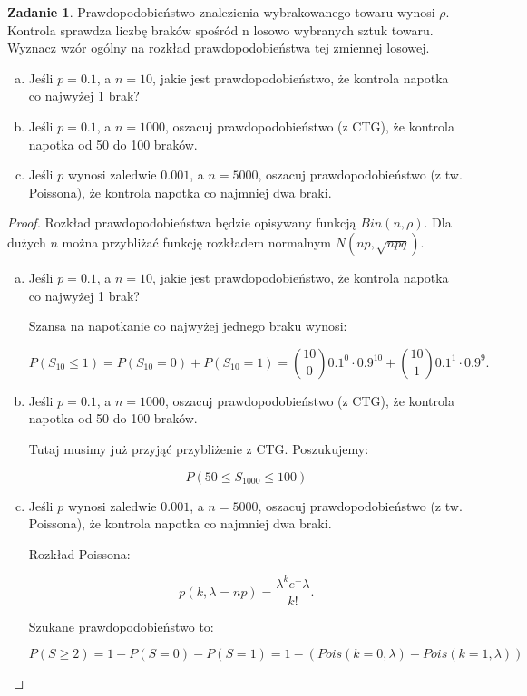 \documentclass[11pt]{article}
\theoremstyle{definition}
\newtheorem{zadanie}{Zadanie}
\begin{document}
\begin{zadanie}
    Prawdopodobieństwo znalezienia wybrakowanego towaru wynosi $\rho$. Kontrola sprawdza liczbę braków spośród n losowo wybranych sztuk towaru. Wyznacz wzór ogólny na rozkład prawdopodobieństwa tej zmiennej losowej.
    \begin{enumerate}[a)]
        \item Jeśli $p = 0.1$, a $n = 10$, jakie jest prawdopodobieństwo, że kontrola napotka co najwyżej 1 brak?
        \item Jeśli $p = 0.1$, a $n = 1000$, oszacuj prawdopodobieństwo (z CTG), że kontrola napotka od 50 do 100 braków.
        \item Jeśli $p$ wynosi zaledwie $0.001$, a $n = 5000$, oszacuj prawdopodobieństwo (z tw. Poissona), że kontrola napotka co najmniej dwa braki.
    \end{enumerate}
\end{zadanie}
\begin{proof}
    Rozkład prawdopodobieństwa będzie opisywany funkcją $Bin(n,\rho)$. Dla dużych $n$ można przybliżać funkcję rozkładem normalnym $N(np,\sqrt{npq})$.
    \begin{enumerate}[a)]
        \item Jeśli $p = 0.1$, a $n = 10$, jakie jest prawdopodobieństwo, że kontrola napotka co najwyżej 1 brak?

              Szansa na napotkanie co najwyżej jednego braku wynosi:

              $$P(S_{10}\leq 1) = P(S_{10}=0) + P(S_{10}=1) = \binom{10}{0}0.1^0\cdot0.9^{10}+\binom{10}{1}0.1^1\cdot0.9^9.$$

        \item Jeśli $p = 0.1$, a $n = 1000$, oszacuj prawdopodobieństwo (z CTG), że kontrola napotka od 50 do 100 braków.

              Tutaj musimy już przyjąć przybliżenie z CTG. Poszukujemy:

              $$P(50\leq S_{1000}\leq 100)$$

        \item Jeśli $p$ wynosi zaledwie $0.001$, a $n = 5000$, oszacuj prawdopodobieństwo (z tw. Poissona), że kontrola napotka co najmniej dwa braki.

              Rozkład Poissona:

              $$p(k,\lambda=np) = \frac{\lambda^ke^-\lambda}{k!}.$$

              Szukane prawdopodobieństwo to:

              $$P(S\geq 2) = 1 - P(S=0) - P(S=1) = 1- (Pois(k=0,\lambda)+Pois(k=1,\lambda))$$


    \end{enumerate}
\end{proof}
\end{document}
